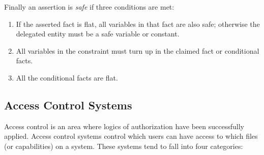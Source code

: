 \documentclass[a4paper]{article}
\begin{document}
\begin{algorithm}[H]
\end{algorithm}

Finally an assertion is \emph{safe} if three conditions are met:

\begin{enumerate}
  \item If the asserted fact is flat, all variables in that fact are also safe;
    otherwise the delegated entity must be a safe variable or constant.
  \item All variables in the constraint must turn up in the claimed fact or
    conditional facts.
  \item All the conditional facts are flat.
\end{enumerate}

\begin{algorithm}[H]
\end{algorithm}



\subsection{Access Control Systems}

Access control is an area where logics of authorization have been successfully
applied.  Access control systems control which users can have access to which
files (or capabilities) on a system.  These systems tend to fall into four categories:
\end{document}

